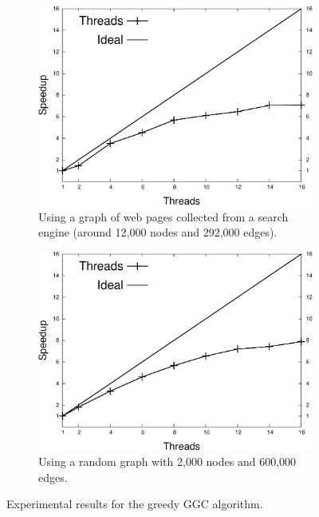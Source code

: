 \begin{figure}[hp]
   \centering
   \begin{subfigure}[b]{0.45\textwidth}
      \includegraphics[width=\textwidth]{new-benchmarks/speedup_greedy-graph-coloring-search_engines.pdf}
      \caption{Using a graph of web pages collected from a search engine (around 12,000 nodes and 292,000 edges).}
   \end{subfigure}
   \begin{subfigure}[b]{0.45\textwidth}
      \includegraphics[width=\textwidth]{new-benchmarks/speedup_greedy-graph-coloring-2000.pdf}
      \caption{Using a random graph with 2,000 nodes and 600,000 edges.\newline}
   \end{subfigure}
   \caption{Experimental results for the greedy GGC algorithm.}
   \label{exp:graph_coloring}
\end{figure}

